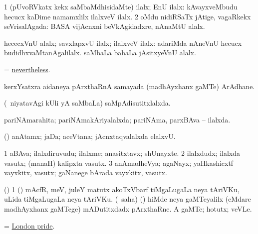 \bentry
{}
\gl{\gu}
\bmng
\bnum
\num{1} (pUvoRVkatx \nA kekx saMbaMdhisidaMte) ilalx; EnU ilalx:  kAvayxveMbudu hecucx kaDime namamxlilx ilalxveV ilalx. 
\num{2} oMdu nidiRSaTx jAtige, vagaRkekx seVrisalAgada:  BASA vijAcnxni beVkAgidadxre, nAnaMtU alalx. 
\enum
\emng
\eentry

\bentry
{}
\gl{\kirxvi}
\bmng
hececxVnU alalx; savxlapxvU ilalx; ilalxveV ilalx:  adariMda nAneVnU hecucx budidhxvaMtanAgalilalx.  saMbaLa bahaLa jAsitxyeVnU alalx. 
\emng

\noindent
\gl{\pagu}
\bmng
{} = \hyperlink{nevertheless}{nevertheless}. 
\emng
\eentry

\bentry
{}
\gl{\nA}
\bmng
kerxYsatxra aidaneya pArxthaRnA samayada (madhAyxhanx  gaMTe) ArAdhane. 
\emng
\eentry

\bentry
{}
\gl{\gu}
\bmng
(\kanmu\ niyatavAgi kUli yA saMbaLa) saMpAdisutitxlalxda. 
\emng
\eentry

\bentry
{}
\gl{\gu}
\bmng
pariNAmarahita; pariNAmakAriyalalxda; pariNAma, parxBAva -- ilalxda. 
\emng
\eentry

\bentry
{}
\gl{\nA}
\bmng
(\tashA) anAtamx; jaDa; aceVtana; jAcnxtaqvalalxda elalxvU. 
\emng
\eentry

\bentry
{}
\gl{\nA}
\bmng
\bnum
\num{1} aBAva; ilalxdiruvudu; ilalxme; anasitxtavx; shUnayxte. 
\num{2} ilalxdudx; ilalxda vasutx; (manaH) kalipxta vasutx. 
\num{3} anAmadheVya; agaNayx; yaHkashicxtf vayxkitx, vasutx; gaNanege bArada vayxkitx, vasutx. 
\enum
\emng
\eentry

\bentry
{}
\gl{\nA}
\bmng
(\bava) 
\bnum
\num{1} (\roVpu) mAcfR, meV, juleY matutx akoTxVbarf tiMgaLugaLa neya tAriVKu, uLida tiMgaLugaLa neya tAriVKu. 
 (\Eva\ saha) (\kerxY) 
\banum
{} hiMde neya gaMTeyalilx (eMdare madhAyxhanx  gaMTege) mADutitxdadx pArxthaRne. 
 A gaMTe; hotutx; veVLe. 
\eanum
\numie
\enum
\emng
\eentry

\bentry
{}
\gl{\nA}
\bmng
= \hyperref{kandict_l.pdf}{L}{London pride}{London pride}. 
\emng
\eentry

